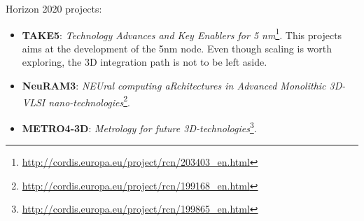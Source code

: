 \documentclass[11pt,a4paper]{extarticle}
\theoremstyle{customdef}
\begin{document}
Horizon 2020 projects:
\begin{itemize}
	\item \textbf{TAKE5}: \textit{Technology Advances and Key Enablers for 5 nm}\footnote{\url{http://cordis.europa.eu/project/rcn/203403_en.html}}. This projects aims at the development of the 5nm node. Even though scaling is worth exploring, the 3D integration path is not to be left aside.
	\item \textbf{NeuRAM3}: \textit{NEUral computing aRchitectures in Advanced Monolithic 3D-VLSI nano-technologies}\footnote{\url{http://cordis.europa.eu/project/rcn/199168_en.html}}.
	\item \textbf{METRO4-3D}: \textit{Metrology for future 3D-technologies}\footnote{\url{http://cordis.europa.eu/project/rcn/199865_en.html}}.
\end{itemize}
\newpage

% 

\end{document}

